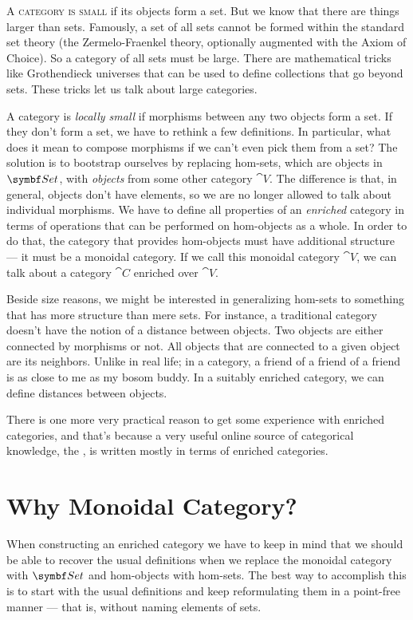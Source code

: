 \lettrine[lhang=0.17]{A}{ category is small} if its objects form a set. But we know that
there are things larger than sets. Famously, a set of all sets cannot be
formed within the standard set theory (the Zermelo-Fraenkel theory,
optionally augmented with the Axiom of Choice). So a category of all
sets must be large. There are mathematical tricks like Grothendieck
universes that can be used to define collections that go beyond sets.
These tricks let us talk about large categories.

A category is \emph{locally small} if morphisms between any two objects
form a set. If they don't form a set, we have to rethink a few
definitions. In particular, what does it mean to compose morphisms if we
can't even pick them from a set? The solution is to bootstrap ourselves
by replacing hom-sets, which are objects in $\Set$, with
\emph{objects} from some other category $\cat{V}$. The difference is
that, in general, objects don't have elements, so we are no longer
allowed to talk about individual morphisms. We have to define all
properties of an \emph{enriched} category in terms of operations that
can be performed on hom-objects as a whole. In order to do that, the
category that provides hom-objects must have additional structure --- it
must be a monoidal category. If we call this monoidal category $\cat{V}$,
we can talk about a category $\cat{C}$ enriched over $\cat{V}$.

Beside size reasons, we might be interested in generalizing hom-sets to
something that has more structure than mere sets. For instance, a
traditional category doesn't have the notion of a distance between
objects. Two objects are either connected by morphisms or not. All
objects that are connected to a given object are its neighbors. Unlike
in real life; in a category, a friend of a friend of a friend is as
close to me as my bosom buddy. In a suitably enriched category, we can
define distances between objects.

There is one more very practical reason to get some experience with
enriched categories, and that's because a very useful online source of
categorical knowledge, the , is written
mostly in terms of enriched categories.

\section{Why Monoidal Category?}

When constructing an enriched category we have to keep in mind that we
should be able to recover the usual definitions when we replace the
monoidal category with $\Set$ and hom-objects with hom-sets. The
best way to accomplish this is to start with the usual definitions and
keep reformulating them in a point-free manner --- that is, without
naming elements of sets.

